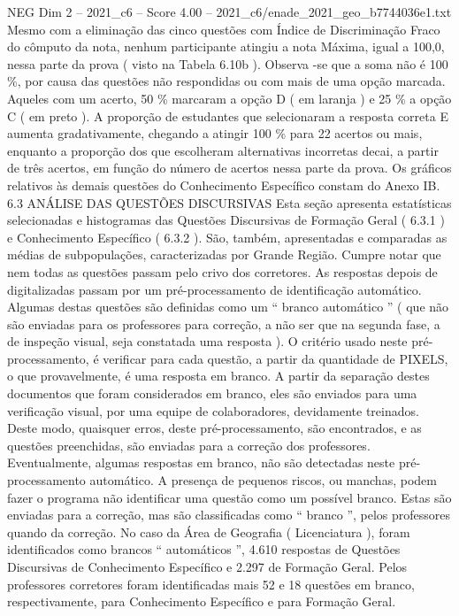 \begin{textsample}{NEG Dim 2 – 2021\_c6 – Score 4.00 – 2021\_c6/enade\_2021\_geo\_b7744036e1.txt}
Mesmo com a eliminação das cinco questões com Índice de Discriminação Fraco do cômputo da nota, nenhum participante atingiu a nota Máxima, igual a 100,0, nessa parte da prova ( visto na Tabela 6.10b ).
Observa -se que a soma não é 100 \%, por causa das questões não respondidas ou com mais de uma opção marcada.
Aqueles com um acerto, 50 \% marcaram a opção D ( em laranja ) e 25 \% a opção C ( em preto ).
A proporção de estudantes que selecionaram a resposta correta E aumenta gradativamente, chegando a atingir 100 \% para 22 acertos ou mais, enquanto a proporção dos que escolheram alternativas incorretas decai, a partir de três acertos, em função do número de acertos nessa parte da prova.
Os gráficos relativos às demais questões do Conhecimento Específico constam do Anexo IB. 6.3 ANÁLISE DAS QUESTÕES DISCURSIVAS Esta seção apresenta estatísticas selecionadas e histogramas das Questões Discursivas de Formação Geral ( 6.3.1 ) e Conhecimento Específico ( 6.3.2 ).
São, também, apresentadas e comparadas as médias de subpopulações, caracterizadas por Grande Região.
Cumpre notar que nem todas as questões passam pelo crivo dos corretores.
As respostas depois de digitalizadas passam por um pré-processamento de identificação automático.
Algumas destas questões são definidas como um “ branco automático ” ( que não são enviadas para os professores para correção, a não ser que na segunda fase, a de inspeção visual, seja constatada uma resposta ).
O critério usado neste pré-processamento, é verificar para cada questão, a partir da quantidade de PIXELS, o que provavelmente, é uma resposta em branco.
A partir da separação destes documentos que foram considerados em branco, eles são enviados para uma verificação visual, por uma equipe de colaboradores, devidamente treinados.
Deste modo, quaisquer erros, deste pré-processamento, são encontrados, e as questões preenchidas, são enviadas para a correção dos professores.
Eventualmente, algumas respostas em branco, não são detectadas neste pré-processamento automático.
A presença de pequenos riscos, ou manchas, podem fazer o programa não identificar uma questão como um possível branco.
Estas são enviadas para a correção, mas são classificadas como “ branco ”, pelos professores quando da correção.
No caso da Área de Geografia ( Licenciatura ), foram identificados como brancos “ automáticos ”, 4.610 respostas de Questões Discursivas de Conhecimento Específico e 2.297 de Formação Geral.
Pelos professores corretores foram identificadas mais 52 e 18 questões em branco, respectivamente, para Conhecimento Específico e para Formação Geral.

\end{textsample}
